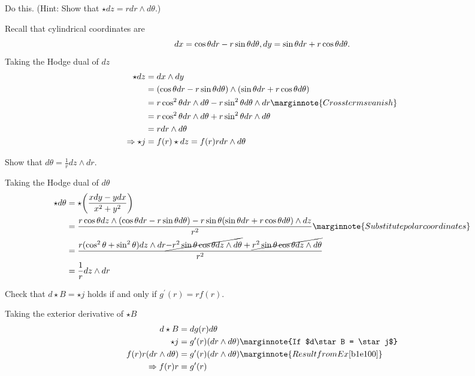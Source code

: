 \documentclass[10pt]{article}
\begin{document}
\begin{example}\label{b1e100}
	Do this. (Hint: Show that $\star dz = rdr \wedge d\theta$.)
\end{example}
\sol Recall that cylindrical coordinates are
$$
dx = \cos\theta dr - r\sin\theta d\theta,\\
dy = \sin\theta dr + r\cos\theta d\theta.
$$
Taking the Hodge dual of $dz$
$$
\begin{aligned}
	\star dz &= dx \wedge dy\\
	&= (\cos\theta dr - r\sin\theta d\theta) \wedge (\sin\theta dr + r\cos\theta d\theta)\\
	&= r\cos^2\theta dr \wedge d\theta - r\sin^2\theta d\theta \wedge dr\marginnote{Cross terms vanish}\\
	&= r\cos^2\theta dr \wedge d\theta + r\sin^2\theta dr \wedge d\theta\\
	&= rdr \wedge d\theta\\
	\Rightarrow \star j &= f(r)\star dz = f(r)r dr \wedge d\theta
\end{aligned}
$$


\begin{example}
	Show that $d\theta = \frac1r dz \wedge dr$.
\end{example}
\sol Taking the Hodge dual of $d\theta$
$$
\begin{aligned}
	\star d\theta &= \star\p*{\frac{xdy-ydx}{x^2+y^2}}\\
	&= \frac{r\cos\theta dz\wedge (\cos\theta dr - r\sin\theta d\theta)- r\sin\theta (\sin\theta dr + r\cos\theta d\theta)\wedge dz}{r^2}\marginnote{Substitute polar coordinates}\\
	&= \frac{r(\cos^2\theta +\sin^2\theta) dz \wedge dr \cancel{- r^2\sin\theta\cos\theta dz\wedge d\theta} + \cancel{r^2\sin\theta\cos\theta dz\wedge d\theta}}{r^2}\\
	&= \frac1r dz \wedge dr
\end{aligned}
$$


\begin{example}
	Check that $d\star B = \star j$ holds if and only if $g^\prime(r) = rf(r)$.
\end{example}
\sol Taking the exterior derivative of $\star B$
$$
\begin{aligned}
	d\star B &= dg(r)d\theta\\
	\star j &= g^\prime(r)(dr \wedge d\theta)\marginnote{If $d\star B = \star j$}\\
	f(r)r(dr \wedge d\theta) &= g^\prime(r)(dr \wedge d\theta)\marginnote{Result from Ex \ref{b1e100}}\\
	\Rightarrow f(r)r &= g^\prime(r)
\end{aligned}
$$
\end{document}
